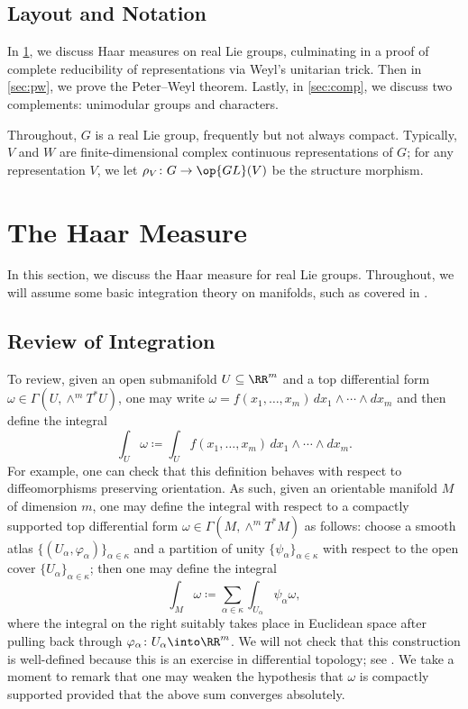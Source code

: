 \documentclass[notes.tex]{subfiles}
\begin{document}
\subsection{Layout and Notation}
In \cref{sec:haar}, we discuss Haar measures on real Lie groups, culminating in a proof of complete reducibility of representations via Weyl's unitarian trick. Then in \cref{sec:pw}, we prove the Peter--Weyl theorem. Lastly, in \cref{sec:comp}, we discuss two complements: unimodular groups and characters.

Throughout, $G$ is a real Lie group, frequently but not always compact. Typically, $V$ and $W$ are finite-dimensional complex continuous representations of $G$; for any representation $V$, we let $\rho_V\colon G\to\op{GL}(V)$ be the structure morphism.

\section{The Haar Measure} \label{sec:haar}
In this section, we discuss the Haar measure for real Lie groups. Throughout, we will assume some basic integration theory on manifolds, such as covered in \cite[Chapter~16]{lee-manifolds}.

\subsection{Review of Integration} \label{subsec:integrate-manifold}
To review, given an open submanifold $U\subseteq\RR^m$ and a top differential form $\omega\in\Gamma(U,\land^mT^*U)$, one may write $\omega=f(x_1,\ldots,x_m)\,dx_1\land\cdots\land dx_m$ and then define the integral
\[\int_U\omega\coloneqq\int_Uf(x_1,\ldots,x_m)\,dx_1\land\cdots\land dx_m.\]
For example, one can check that this definition behaves with respect to diffeomorphisms preserving orientation. As such, given an orientable manifold $M$ of dimension $m$, one may define the integral with respect to a compactly supported top differential form $\omega\in\Gamma(M,\land^mT^*M)$ as follows: choose a smooth atlas $\{(U_\alpha,\varphi_\alpha)\}_{\alpha\in\kappa}$ and a partition of unity $\{\psi_\alpha\}_{\alpha\in\kappa}$ with respect to the open cover $\{U_\alpha\}_{\alpha\in\kappa}$; then one may define the integral
\[\int_M\omega\coloneqq\sum_{\alpha\in\kappa}\int_{U_\alpha}\psi_\alpha\omega,\]
where the integral on the right suitably takes place in Euclidean space after pulling back through $\varphi_\alpha\colon U_\alpha\into\RR^m$. We will not check that this construction is well-defined because this is an exercise in differential topology; see \cite[Propositions~16.3--16.5]{lee-manifolds}. We take a moment to remark that one may weaken the hypothesis that $\omega$ is compactly supported provided that the above sum converges absolutely.
\end{document}
